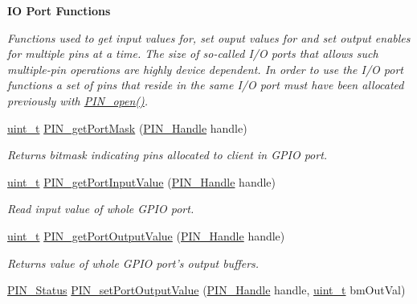 \begin{Indent}{\bf I\-O Port Functions}\par
{\em Functions used to get input values for, set ouput values for and set output enables for multiple pins at a time. The size of so-\/called I/\-O ports that allows such multiple-\/pin operations are highly device dependent. In order to use the I/\-O port functions a set of pins that reside in the same I/\-O port must have been allocated previously with \hyperlink{_p_i_n_8h_a731c5bb641ffeb064579432adfc8dba0}{P\-I\-N\-\_\-open()}. }\begin{DoxyCompactItemize}
\item 
\hyperlink{_p_i_n_8h_a12a1e9b3ce141648783a82445d02b58d}{uint\-\_\-t} \hyperlink{_p_i_n_8h_a9f5b2367253b355909032742a7e6b5e0}{P\-I\-N\-\_\-get\-Port\-Mask} (\hyperlink{_p_i_n_8h_afb2de52b054638f63c39df1f30a0d88d}{P\-I\-N\-\_\-\-Handle} handle)
\begin{DoxyCompactList}\small\item\em Returns bitmask indicating pins allocated to client in G\-P\-I\-O port. \end{DoxyCompactList}\item 
\hyperlink{_p_i_n_8h_a12a1e9b3ce141648783a82445d02b58d}{uint\-\_\-t} \hyperlink{_p_i_n_8h_a726e06dcb7c0d096efaee431ae7b2aaa}{P\-I\-N\-\_\-get\-Port\-Input\-Value} (\hyperlink{_p_i_n_8h_afb2de52b054638f63c39df1f30a0d88d}{P\-I\-N\-\_\-\-Handle} handle)
\begin{DoxyCompactList}\small\item\em Read input value of whole G\-P\-I\-O port. \end{DoxyCompactList}\item 
\hyperlink{_p_i_n_8h_a12a1e9b3ce141648783a82445d02b58d}{uint\-\_\-t} \hyperlink{_p_i_n_8h_ae7dedbfc51ba785bb2f546eed5fdd806}{P\-I\-N\-\_\-get\-Port\-Output\-Value} (\hyperlink{_p_i_n_8h_afb2de52b054638f63c39df1f30a0d88d}{P\-I\-N\-\_\-\-Handle} handle)
\begin{DoxyCompactList}\small\item\em Returns value of whole G\-P\-I\-O port's output buffers. \end{DoxyCompactList}\item 
\hyperlink{_p_i_n_8h_abe0ad59bbf09e51fe37195a5e70b23f6}{P\-I\-N\-\_\-\-Status} \hyperlink{_p_i_n_8h_a380bb69c858753895cf62fb462797fc6}{P\-I\-N\-\_\-set\-Port\-Output\-Value} (\hyperlink{_p_i_n_8h_afb2de52b054638f63c39df1f30a0d88d}{P\-I\-N\-\_\-\-Handle} handle, \hyperlink{_p_i_n_8h_a12a1e9b3ce141648783a82445d02b58d}{uint\-\_\-t} bm\-Out\-Val)

\end{DoxyCompactItemize}
\end{Indent}
